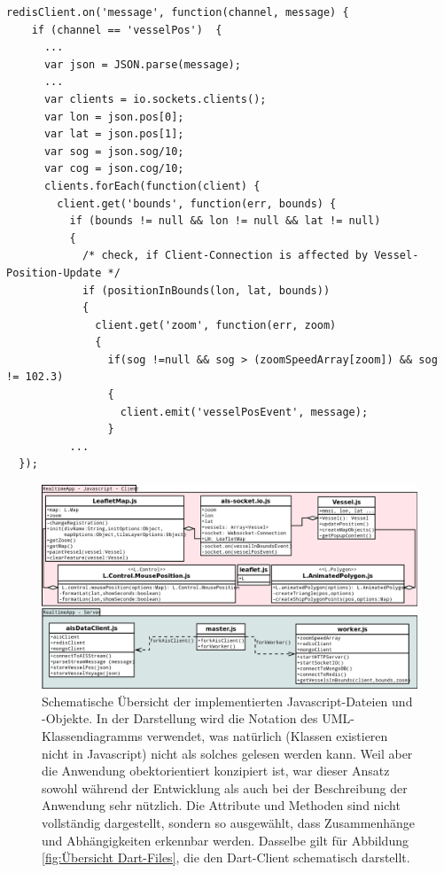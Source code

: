 \begin{lstlisting}[caption= Weiterleitung von Positions-Updates an Websocket-Clients in worker.js, label= Weiterleitung von Positions-Updates an Websocket-Clients in worker.js]
 redisClient.on('message', function(channel, message) {
    if (channel == 'vesselPos')  {
      ...
      var json = JSON.parse(message);
      ...
      var clients = io.sockets.clients();
      var lon = json.pos[0];
      var lat = json.pos[1];
      var sog = json.sog/10;
      var cog = json.cog/10;
      clients.forEach(function(client) {
        client.get('bounds', function(err, bounds) {
          if (bounds != null && lon != null && lat != null) 
          {
            /* check, if Client-Connection is affected by Vessel-Position-Update */
            if (positionInBounds(lon, lat, bounds)) 
            {
              client.get('zoom', function(err, zoom) 
              {
                if(sog !=null && sog > (zoomSpeedArray[zoom]) && sog != 102.3)
                {
                  client.emit('vesselPosEvent', message);
                }
          ...
  });
\end{lstlisting}
\begin{figure}[H]
  \centering
  \includegraphics[width=6in]{images/Javascript-Dateien-undObjekte.png}
  \caption[Übersicht Javascript-Files]{Schematische Übersicht der implementierten Javascript-Dateien und -Objekte. In der Darstellung wird die Notation des UML-Klassendiagramms verwendet, was natürlich (Klassen existieren nicht in Javascript) nicht als solches gelesen werden kann. Weil aber die Anwendung obektorientiert konzipiert ist, war dieser Ansatz sowohl während der Entwicklung als auch bei der Beschreibung der Anwendung sehr nützlich. Die Attribute und Methoden sind nicht vollständig dargestellt, sondern so ausgewählt, dass Zusammenhänge und Abhängigkeiten erkennbar werden.
Dasselbe gilt für Abbildung  \ref{fig:Übersicht Dart-Files}, die den Dart-Client schematisch darstellt. }
  \label{fig:Übersicht Javascript-Files}
\end{figure}

